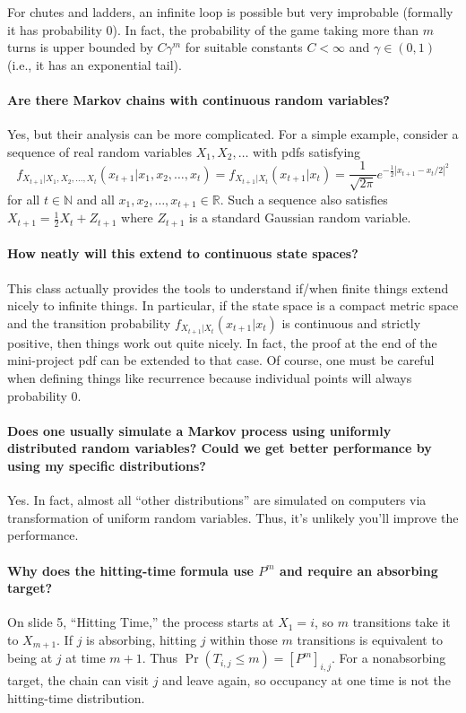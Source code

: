 \documentclass[10pt,english]{article}
\begin{document}
For chutes and ladders, an infinite loop is possible but very improbable (formally it has probability 0).
In fact, the probability of the game taking more than $m$ turns is upper bounded by $C\gamma^m$ for suitable constants $C<\infty$ and $\gamma \in (0,1)$ (i.e., it has an exponential tail).


\paragraph{Are there Markov chains with continuous random variables?}

Yes, but their analysis can be more complicated.
For a simple example, consider a sequence of real random variables $X_1,X_2,\ldots$ with pdfs satisfying
$$ f_{X_{t+1}|X_1,X_2,\ldots,X_{t}} (x_{t+1}|x_1,x_2,\ldots,x_{t}) = f_{X_{t+1}|X_{t}} (x_{t+1}|x_{t}) = \frac{1}{\sqrt{2\pi}} e^{-\frac{1}{2}|x_{t+1}-x_{t}/2|^2} $$
for all $t\in \mathbb{N}$ and all $x_1,x_2,\ldots,x_{t+1} \in \mathbb{R}$.
Such a sequence also satisfies $X_{t+1} = \frac{1}{2}X_{t} + Z_{t+1}$ where $Z_{t+1}$ is a standard Gaussian random variable.


\paragraph{How neatly will this extend to continuous state spaces?}

This class actually provides the tools to understand if/when finite things extend nicely to infinite things.
In particular, if the state space is a compact metric space and the transition probability $f_{X_{t+1} | X_t} (x_{t+1}|x_t)$ is continuous and strictly positive, then things work out quite nicely.
In fact, the proof at the end of the mini-project pdf can be extended to that case.
Of course, one must be careful when defining things like recurrence because individual points will always probability 0.


\paragraph{Does one usually simulate a Markov process using uniformly distributed random variables? Could we get better performance by using my specific distributions?}

Yes.
In fact, almost all ``other distributions'' are simulated on computers via transformation of uniform random variables.
Thus, it's unlikely you'll improve the performance.


\paragraph{Why does the hitting-time formula use $P^m$ and require an absorbing target?}
On slide 5, ``Hitting Time,'' the process starts at $X_1=i$, so $m$ transitions take it to $X_{m+1}$.
If $j$ is absorbing, hitting $j$ within those $m$ transitions is equivalent to being at $j$ at time $m+1$.
Thus $\Pr(T_{i,j}\leq m)=[P^m]_{i,j}$.
For a nonabsorbing target, the chain can visit $j$ and leave again, so occupancy at one time is not the hitting-time distribution.
\end{document}
